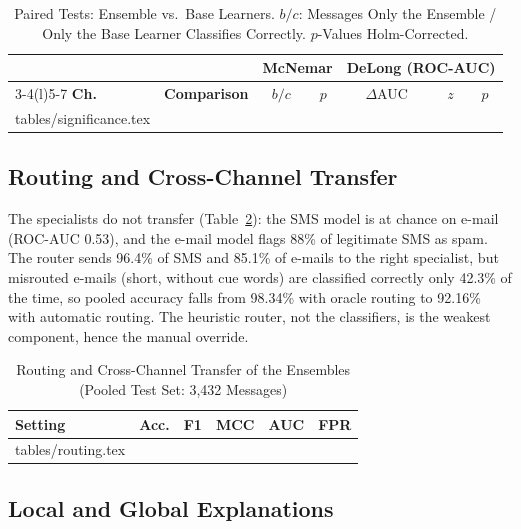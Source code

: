\documentclass[conference]{IEEEtran}
\makeatletter
\newcommand{\inputtable}[1]{\@@input #1 }
\makeatother
\begin{document}
\begin{table}[!t]
\caption{Paired Tests: Ensemble vs.\ Base Learners. $b/c$: Messages Only the Ensemble / Only the Base Learner Classifies Correctly. $p$-Values Holm-Corrected.}
\label{tab:significance}
\centering
\footnotesize
\setlength{\tabcolsep}{3.5pt}
\begin{tabular}{@{}llccccc@{}}
\toprule
 & & \multicolumn{2}{c}{\textbf{McNemar}} & \multicolumn{3}{c}{\textbf{DeLong (ROC-AUC)}} \\
\cmidrule(lr){3-4}\cmidrule(l){5-7}
\textbf{Ch.} & \textbf{Comparison} & $b/c$ & $p$ & $\Delta$AUC & $z$ & $p$ \\
\midrule
\inputtable{tables/significance.tex}
\bottomrule
\end{tabular}
\end{table}

\subsection{Routing and Cross-Channel Transfer}\label{sec:routing}

The specialists do not transfer (Table~\ref{tab:routing}): the SMS model is at
chance on e-mail (ROC-AUC 0.53), and the e-mail model flags 88\% of legitimate
SMS as spam. The router sends 96.4\% of SMS and 85.1\% of e-mails to the right
specialist, but misrouted e-mails (short, without cue words) are classified
correctly only 42.3\% of the time, so pooled accuracy falls from 98.34\% with
oracle routing to 92.16\% with automatic routing. The heuristic router, not
the classifiers, is the weakest component, hence the manual override.

\begin{table}[!t]
\caption{Routing and Cross-Channel Transfer of the Ensembles (Pooled Test Set: 3,432 Messages)}
\label{tab:routing}
\centering
\footnotesize
\setlength{\tabcolsep}{3.2pt}
\begin{tabular}{@{}lccccc@{}}
\toprule
\textbf{Setting} & \textbf{Acc.} & \textbf{F1} & \textbf{MCC} & \textbf{AUC} & \textbf{FPR} \\
\midrule
\inputtable{tables/routing.tex}
\bottomrule
\end{tabular}
\end{table}

\subsection{Local and Global Explanations}
\end{document}
